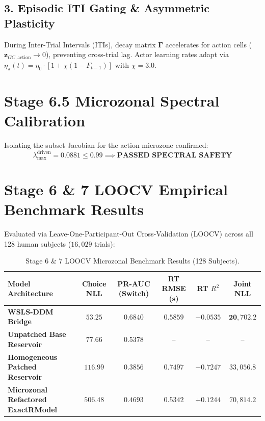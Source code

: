 \documentclass[11pt,a4paper]{article}
\begin{document}
\subsection{3. Episodic ITI Gating \& Asymmetric Plasticity}
During Inter-Trial Intervals (ITIs), decay matrix $\boldsymbol{\Gamma}$ accelerates for action cells ($\mathbf{z}_{GC, \text{action}} \to 0$), preventing cross-trial lag. Actor learning rates adapt via $\eta_\pi(t) = \eta_0 \cdot [1 + \chi (1 - F_{t-1})]$ with $\chi = 3.0$.

\section{Stage 6.5 Microzonal Spectral Calibration}

Isolating the subset Jacobian for the action microzone confirmed:
\begin{equation}
\lambda_{\max}^{\text{driven}} = 0.0881 \le 0.99 \implies \mathbf{\text{PASSED SPECTRAL SAFETY}}
\end{equation}

\section{Stage 6 \& 7 LOOCV Empirical Benchmark Results}

Evaluated via Leave-One-Participant-Out Cross-Validation (LOOCV) across all 128 human subjects ($16,029$ trials):

\begin{table}[H]
\centering
\caption{Stage 6 \& 7 LOOCV Microzonal Benchmark Results (128 Subjects).}
\label{tab:microzonal_results}
\vspace{0.5em}
\small
\begin{tabular}{l c c c c c}
\toprule
\textbf{Model Architecture} & \textbf{Choice NLL} & \textbf{PR-AUC (Switch)} & \textbf{RT RMSE (s)} & \textbf{RT $R^2$} & \textbf{Joint NLL} \\
\midrule
\textbf{WSLS-DDM Bridge} & $\mathbf{53.25}$ & $\mathbf{0.6840}$ & $0.5859$ & $-0.0535$ & $\mathbf{20,702.2}$ \\
\textbf{Unpatched Base Reservoir} & $77.66$ & $0.5378$ & -- & -- & -- \\
\textbf{Homogeneous Patched Reservoir} & $116.99$ & $0.3856$ & $0.7497$ & $-0.7247$ & $33,056.8$ \\
\textbf{Microzonal Refactored ExactRModel} & $506.48$ & $0.4693$ & $\mathbf{0.5342}$ & $\mathbf{+0.1244}$ & $70,814.2$ \\
\bottomrule
\end{tabular}
\end{table}
\end{document}
